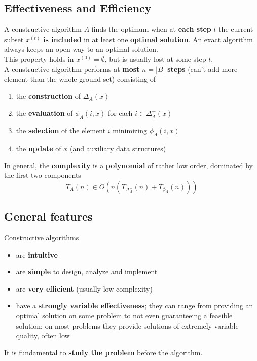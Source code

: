 \documentclass[11pt]{article}
\begin{document}
	\newpage
	
	\subsection{Effectiveness and Efficiency}
	A constructive algorithm $A$ finds the optimum when at \textbf{each step} $t$ the current subset $x^{(t)}$ \textbf{is included} in at least one \textbf{optimal solution}. An exact algorithm always keeps an open way to an optimal solution.\\
	This property holds in $x^{(0)} = \emptyset$, but is usually lost at some step $t$,\\
	
	A constructive algorithm performs at \textbf{most} $n = |B|$ \textbf{steps} (can't add more element than the whole ground set) consisting of 
	\begin{enumerate}
		\item the \textbf{construction} of $\Delta_A^+ (x)$
		\item the \textbf{evaluation} of $\phi_A (i,x)$ for each $i \in \Delta_A^+(x)$
		\item the \textbf{selection} of the element $i$ minimizing $\phi_A (i,x)$
		\item the \textbf{update} of $x$ (and auxiliary data structures)
	\end{enumerate}
	In general, the \textbf{complexity} is a \textbf{polynomial} of rather low order, dominated by the first two components
	$$ T_A (n) \in O\left(n \left(T_{\Delta_A^+} (n) + T_{\phi_A} (n)\right)\right) $$
	
	\newpage
	
	\subsection{General features}
	Constructive algorithms
	\begin{itemize}
		\item are \textbf{intuitive}
		\item are \textbf{simple} to design, analyze and implement
		\item are \textbf{very efficient} (usually low complexity)
		\item have a \textbf{strongly variable effectiveness}; they can range from providing an optimal solution on some problem to not even guaranteeing a feasible solution; on most problems they provide solutions of extremely variable quality, often low
	\end{itemize}
	It is fundamental to \textbf{study the problem} before the algorithm.\\
	
\end{document}
